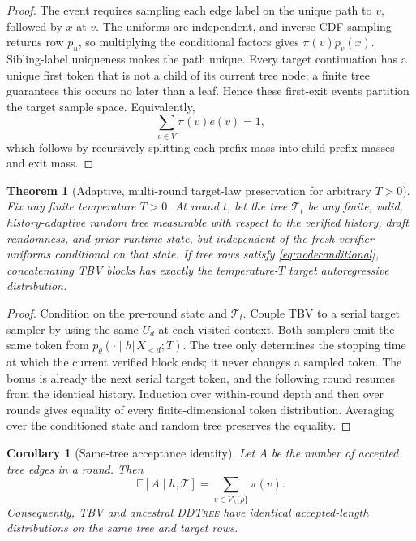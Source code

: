 \documentclass{article}
\newtheorem{theorem}{Theorem}
\newtheorem{corollary}{Corollary}
\newcommand{\T}{\mathcal{T}}
\newcommand{\E}{\mathbb{E}}
\newcommand{\TBV}{\textnormal{\textsc{TBV}}}
\newcommand{\DDTree}{\textnormal{\textsc{DDTree}}}
\begin{document}
\begin{proof}
The event requires sampling each edge label on the unique path to $v$, followed by $x$ at $v$.  The uniforms are independent, and inverse-CDF sampling returns row $p_u$, so multiplying the conditional factors gives $\pi(v)p_v(x)$.  Sibling-label uniqueness makes the path unique.  Every target continuation has a unique first token that is not a child of its current tree node; a finite tree guarantees this occurs no later than a leaf.  Hence these first-exit events partition the target sample space.  Equivalently,
\begin{equation}
\sum_{v\in V}\pi(v)e(v)=1,
\end{equation}
which follows by recursively splitting each prefix mass into child-prefix masses and exit mass.
\end{proof}

\begin{theorem}[Adaptive, multi-round target-law preservation for arbitrary $T>0$]
\label{thm:multiround}
Fix any finite temperature $T>0$.  At round $t$, let the tree $\T_t$ be any finite, valid, history-adaptive random tree measurable with respect to the verified history, draft randomness, and prior runtime state, but independent of the fresh verifier uniforms conditional on that state.  If tree rows satisfy \eqref{eq:nodeconditional}, concatenating \TBV{} blocks has exactly the temperature-$T$ target autoregressive distribution.
\end{theorem}

\begin{proof}
Condition on the pre-round state and $\T_t$.  Couple \TBV{} to a serial target sampler by using the same $U_d$ at each visited context.  Both samplers emit the same token from $p_\theta(\cdot\mid h\Vert X_{<d};T)$.  The tree only determines the stopping time at which the current verified block ends; it never changes a sampled token.  The bonus is already the next serial target token, and the following round resumes from the identical history.  Induction over within-round depth and then over rounds gives equality of every finite-dimensional token distribution.  Averaging over the conditioned state and random tree preserves the equality.
\end{proof}

\begin{corollary}[Same-tree acceptance identity]
\label{cor:acceptance}
Let $A$ be the number of accepted tree edges in a round.  Then
\begin{equation}
  \E[A\mid h,\T]=\sum_{v\in V\setminus\{\rho\}}\pi(v).
  \label{eq:expectedacceptance}
\end{equation}
Consequently, \TBV{} and ancestral \DDTree{} have identical accepted-length distributions on the same tree and target rows.
\end{corollary}
\end{document}
